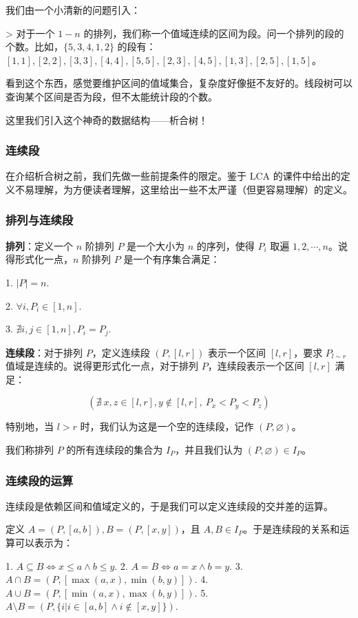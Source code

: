 \documentclass[12pt]{ctexart}
\begin{document}
我们由一个小清新的问题引入：

> 对于一个 $1-n$ 的排列，我们称一个值域连续的区间为段。问一个排列的段的个数。比如，$\{5 ,3 ,4, 1 ,2\}$ 的段有：$[1,1],[2,2],[3,3],[4,4],[5,5],[2,3],[4,5],[1,3],[2,5],[1,5]$。

看到这个东西，感觉要维护区间的值域集合，复杂度好像挺不友好的。线段树可以查询某个区间是否为段，但不太能统计段的个数。

这里我们引入这个神奇的数据结构——析合树！

\subsubsection{连续段}

在介绍析合树之前，我们先做一些前提条件的限定。鉴于 LCA 的课件中给出的定义不易理解，为方便读者理解，这里给出一些不太严谨（但更容易理解）的定义。

\subsubsection{排列与连续段}

\textbf{排列}：定义一个 $n$ 阶排列 $P$ 是一个大小为 $n$ 的序列，使得 $P_i$ 取遍 $1,2,\cdots,n$。说得形式化一点，$n$ 阶排列 $P$ 是一个有序集合满足：

1. $|P|=n$.

2. $\forall i,P_i\in[1,n]$.

3. $\nexists i,j\in[1,n],P_i=P_j$.

   \textbf{连续段}：对于排列 $P$，定义连续段 $(P,[l,r])$ 表示一个区间 $[l,r]$，要求 $P_{l\sim r}$ 值域是连续的。说得更形式化一点，对于排列 $P$，连续段表示一个区间 $[l,r]$ 满足：

$$
(\nexists\ x,z\in[l,r],y\notin[l,r],\ P_x<P_y<P_z)
$$

特别地，当 $l>r$ 时，我们认为这是一个空的连续段，记作 $(P,\varnothing)$。

我们称排列 $P$ 的所有连续段的集合为 $I_P$，并且我们认为 $(P,\varnothing)\in I_P$。

\subsubsection{连续段的运算}

连续段是依赖区间和值域定义的，于是我们可以定义连续段的交并差的运算。

定义 $A=(P,[a,b]),B=(P,[x,y])$，且 $A,B\in I_P$。于是连续段的关系和运算可以表示为：

1. $A\subseteq B\iff x\le a\wedge b\le y$.
2. $A=B\iff a=x\wedge b=y$.
3. $A\cap B=(P,[\max(a,x),\min(b,y)])$.
4. $A\cup B=(P,[\min(a,x),\max(b,y)])$.
5. $A\setminus B=(P,\{i|i\in[a,b]\wedge i\notin[x,y]\})$.
\end{document}
